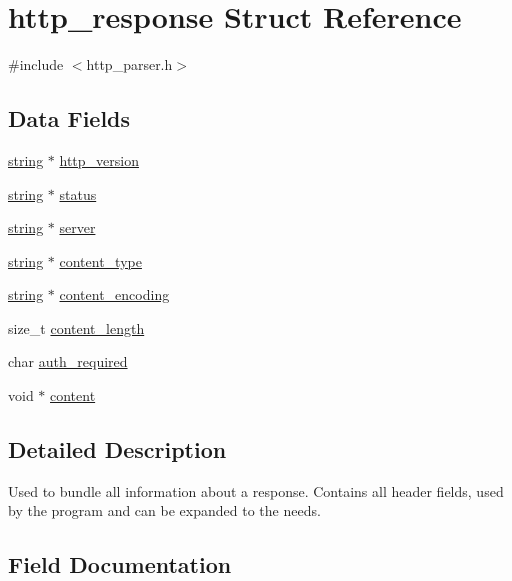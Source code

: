 \hypertarget{structhttp__response}{}\section{http\+\_\+response Struct Reference}
\label{structhttp__response}


{\ttfamily \#include $<$http\+\_\+parser.\+h$>$}

\subsection*{Data Fields}
\begin{DoxyCompactItemize}
\item 
\mbox{\hyperlink{structstring}{string}} $\ast$ \mbox{\hyperlink{structhttp__response_aa2fa632b89e408825ab17250da007e81}{http\+\_\+version}}
\item 
\mbox{\hyperlink{structstring}{string}} $\ast$ \mbox{\hyperlink{structhttp__response_ae7c13e8986edbc2ab93ae3bca1c4dc78}{status}}
\item 
\mbox{\hyperlink{structstring}{string}} $\ast$ \mbox{\hyperlink{structhttp__response_a1034f43729236ac30a1bca5b95ec5b03}{server}}
\item 
\mbox{\hyperlink{structstring}{string}} $\ast$ \mbox{\hyperlink{structhttp__response_aafedf2890cd84785099fb665775f0501}{content\+\_\+type}}
\item 
\mbox{\hyperlink{structstring}{string}} $\ast$ \mbox{\hyperlink{structhttp__response_aa80013c60172b801fb44e61f0ba8f110}{content\+\_\+encoding}}
\item 
size\+\_\+t \mbox{\hyperlink{structhttp__response_a5d3af3f0ffe0a7162b5a69784bb619bc}{content\+\_\+length}}
\item 
char \mbox{\hyperlink{structhttp__response_a4d1dfbf81334ae9cea55b6e5f7b630da}{auth\+\_\+required}}
\item 
void $\ast$ \mbox{\hyperlink{structhttp__response_a3d6d14728fec84498eff595a3e31d15a}{content}}
\end{DoxyCompactItemize}


\subsection{Detailed Description}
Used to bundle all information about a response. Contains all header fields, used by the program and can be expanded to the needs. 

\subsection{Field Documentation}
\mbox{\label{structhttp__response_a4d1dfbf81334ae9cea55b6e5f7b630da}} 
